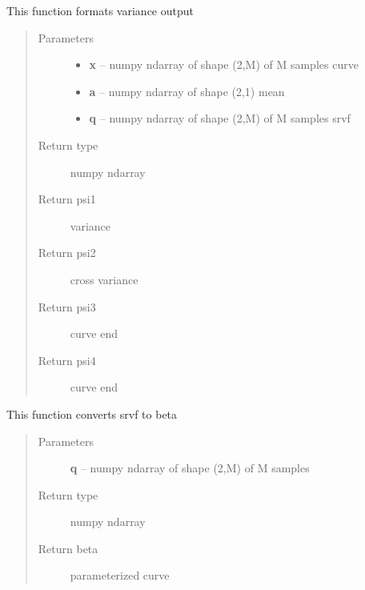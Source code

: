\documentclass[letterpaper,10pt,english]{sphinxmanual}
\begin{document}

\begin{fulllineitems}
\label{curve_functions:curve_functions.psi}
This function formats variance output
\begin{quote}\begin{description}
\item[{Parameters}] \leavevmode\begin{itemize}
\item {} 
\textbf{x} -- numpy ndarray of shape (2,M) of M samples curve

\item {} 
\textbf{a} -- numpy ndarray of shape (2,1) mean

\item {} 
\textbf{q} -- numpy ndarray of shape (2,M) of M samples srvf

\end{itemize}

\item[{Return type}] \leavevmode
numpy ndarray

\item[{Return psi1}] \leavevmode
variance

\item[{Return psi2}] \leavevmode
cross variance

\item[{Return psi3}] \leavevmode
curve end

\item[{Return psi4}] \leavevmode
curve end

\end{description}\end{quote}

\end{fulllineitems}


\begin{fulllineitems}
\label{curve_functions:curve_functions.q_to_curve}
This function converts srvf to beta
\begin{quote}\begin{description}
\item[{Parameters}] \leavevmode
\textbf{q} -- numpy ndarray of shape (2,M) of M samples

\item[{Return type}] \leavevmode
numpy ndarray

\item[{Return beta}] \leavevmode
parameterized curve

\end{description}\end{quote}

\end{fulllineitems}
\end{document}
